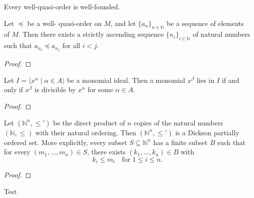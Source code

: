 \begin{corollary}\label{cor:wqo_is_wellFounded} %
    Every well-quasi-order is well-founded.
\end{corollary}
    
\begin{proposition}\label{prop:wqoAscendingSubsequence} %
    \leanok
    Let $\preceq$ be a well- quasi-order on $M$, and let $\{a_n\}_{n \in \mathbb{N}}$ be a sequence of elements of $M$.
    Then there exists a strictly ascending sequence $\{n_i\}_{i \in \mathbb{N}}$ of natural numbers such that $a_{n_i} \preceq a_{n_j}$ for all $i < j$.
\end{proposition}
\begin{proof}
  \leanok %
\end{proof}

\begin{lemma}\label{lem:mem_monomialIdeal_iff_divisible} %
    \leanok %
    Let $I = \langle x^\alpha \mid \alpha \in A \rangle$ be a monomial ideal.
    Then a monomial $x^\beta$ lies in $I$ if and only if $x^\beta$ is divisible by $x^\alpha$ for some $\alpha \in A$.
\end{lemma}
\begin{proof}
  \leanok %
\end{proof}

\begin{theorem}\label{thm:Dickson} %
    \leanok %
    Let $(\mathbb{N}^n, \le')$ be the direct product of $n$ copies of the natural numbers $(\mathbb{N}, \le)$ with their natural ordering. 
    Then $(\mathbb{N}^n, \le')$ is a Dickson partially ordered set. 
    More explicitly, every subset $S \subseteq \mathbb{N}^n$ has a finite subset $B$ such that for every $(m_1, \dots, m_n) \in S$, there exists $(k_1, \dots, k_n) \in B$ with
    \[
    k_i \le m_i \quad \text{for } 1 \le i \le n.
    \]
\end{theorem}
\begin{proof}
  \leanok %
\end{proof}

\begin{theorem}
    \leanok %
    Test
\end{theorem}

